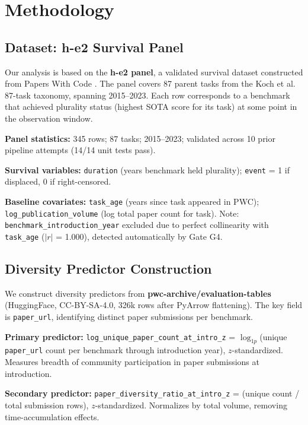 \section{Methodology}

\subsection{Dataset: h-e2 Survival Panel}

Our analysis is based on the \textbf{h-e2 panel}, a validated survival dataset constructed from Papers With Code \cite{paperwithcode2025}. The panel covers 87 parent tasks from the Koch et al.\ \cite{koch2021reduced} 87-task taxonomy, spanning 2015--2023. Each row corresponds to a benchmark that achieved plurality status (highest SOTA score for its task) at some point in the observation window.

\textbf{Panel statistics:} 345 rows; 87 tasks; 2015--2023; validated across 10 prior pipeline attempts (14/14 unit tests pass).

\textbf{Survival variables:} \texttt{duration} (years benchmark held plurality); \texttt{event} = 1 if displaced, 0 if right-censored.

\textbf{Baseline covariates:} \texttt{task\_age} (years since task appeared in PWC); \texttt{log\_publication\_volume} (log total paper count for task). Note: \texttt{benchmark\_introduction\_year} excluded due to perfect collinearity with \texttt{task\_age} ($|r|$ = 1.000), detected automatically by Gate G4.

\subsection{Diversity Predictor Construction}

We construct diversity predictors from \textbf{pwc-archive/evaluation-tables} \cite{paperwithcode2025} (HuggingFace, CC-BY-SA-4.0, 326k rows after PyArrow flattening). The key field is \texttt{paper\_url}, identifying distinct paper submissions per benchmark.

\textbf{Primary predictor:} \texttt{log\_unique\_paper\_count\_at\_intro\_z} = $\log_{1p}$(unique \texttt{paper\_url} count per benchmark through introduction year), $z$-standardized. Measures breadth of community participation in paper submissions at introduction.

\textbf{Secondary predictor:} \texttt{paper\_diversity\_ratio\_at\_intro\_z} = (unique count / total submission rows), $z$-standardized. Normalizes by total volume, removing time-accumulation effects.

